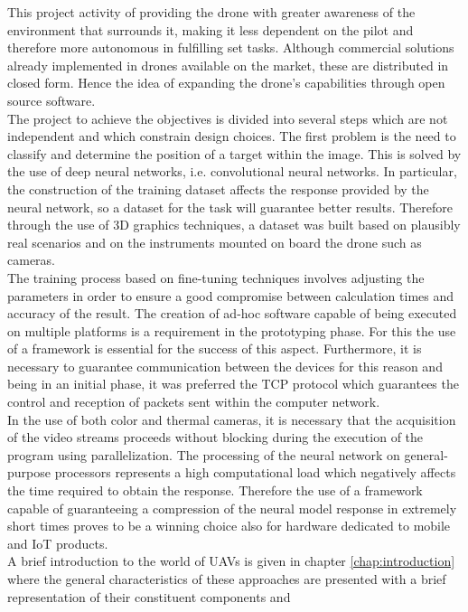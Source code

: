 \noindent This project activity of providing the drone with greater 
awareness of the environment that surrounds it, making it less dependent on the 
pilot and therefore more autonomous in fulfilling set tasks.
Although commercial solutions already implemented in drones available on the 
market, these are distributed in closed form.
Hence the idea of expanding the drone's capabilities through open source 
software.\\
The project to achieve the objectives is divided into several steps which are
not independent and which constrain design choices. The first problem is
the need to classify and determine the position of a target within the image. 
This is solved by the use of deep neural networks, i.e. convolutional neural
networks. 
In particular, the construction of the training dataset affects the response
provided by the neural network, so a dataset for the task will guarantee better
results. 
Therefore through the use of 3D graphics techniques, a dataset was built based
on plausibly real scenarios and on the instruments mounted on board the drone
such as cameras.\\
The training process based on fine-tuning techniques involves adjusting the
parameters in order to ensure a good compromise between calculation times and
accuracy of the result. The creation of ad-hoc software capable of being
executed on multiple platforms is a requirement in the prototyping phase. For
this the use of a framework is essential for the success of this aspect. 
Furthermore, it is necessary to guarantee communication between the devices for
this reason and being in an initial phase, it was preferred the TCP protocol 
which guarantees the control and reception of packets sent within the computer 
network.\\ 
In the use of both color and thermal cameras, it is necessary that the
acquisition of the video streams proceeds without blocking during the execution
of the program using parallelization. 
The processing of the neural network on general-purpose processors represents a
high computational load which negatively affects the time required to obtain the
response.
Therefore the use of a framework capable of guaranteeing a
compression of the neural model response in extremely short times proves to be a 
winning choice also for hardware dedicated to mobile and IoT products.\\
\noindent A brief introduction to the world of UAVs is given in chapter
\ref{chap:introduction} where the general characteristics of these approaches
are presented with a brief representation of their constituent components and
